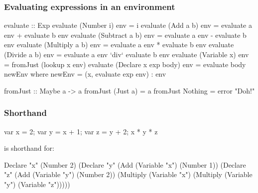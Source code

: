 \documentclass{beamer}
\begin{document}
\begin{frame}[fragile]
\frametitle{Evaluating expressions in an environment}

\begin{tinycode}
evaluate :: Exp %
evaluate (Number i) env     = i
evaluate (Add a b) env       
       = evaluate a env + evaluate b env
evaluate (Subtract a b) env  
       = evaluate a env - evaluate b env
evaluate (Multiply a b) env  
       = evaluate a env * evaluate b env
evaluate (Divide a b) env    
       = evaluate a env `div` evaluate b env
evaluate (Variable x) env    = fromJust (lookup x env)
evaluate (Declare x exp body) env = evaluate body newEnv
  where newEnv = (x, evaluate exp env) : env
  
fromJust :: Maybe a -> a
fromJust (Just a) = a
fromJust Nothing  = error "Doh!"
\end{tinycode}
\end{frame}

\begin{frame}[fragile]
\frametitle{Shorthand}

\begin{hcode}
var x = 2;
var y = x + 1;
var z = y + 2;
x * y * z
\end{hcode}

is shorthand for:

\begin{smallcode}
Declare "x" (Number 2)
 (Declare "y" (Add (Variable "x") (Number 1))
   (Declare "z" (Add (Variable "y") (Number 2))
     (Multiply (Variable "x") 
       (Multiply (Variable "y") 
                 (Variable "z")))))             
\end{smallcode}

\end{frame}
\end{document}
